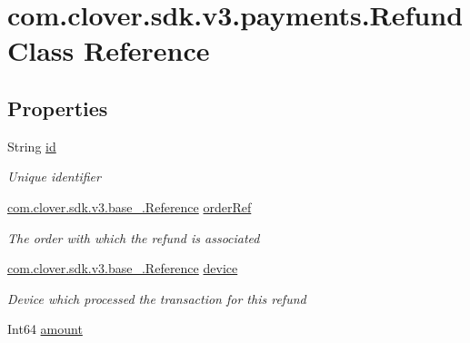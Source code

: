 \hypertarget{classcom_1_1clover_1_1sdk_1_1v3_1_1payments_1_1_refund}{}\section{com.\+clover.\+sdk.\+v3.\+payments.\+Refund Class Reference}
\label{classcom_1_1clover_1_1sdk_1_1v3_1_1payments_1_1_refund}
\subsection*{Properties}
\begin{DoxyCompactItemize}
\item 
String \hyperlink{classcom_1_1clover_1_1sdk_1_1v3_1_1payments_1_1_refund_a17a7c08bf739bab1b4080d0750156c4b}{id}
\begin{DoxyCompactList}\small\item\em Unique identifier \end{DoxyCompactList}\item 
\hyperlink{classcom_1_1clover_1_1sdk_1_1v3_1_1base___1_1_reference}{com.\+clover.\+sdk.\+v3.\+base\+\_\+.\+Reference} \hyperlink{classcom_1_1clover_1_1sdk_1_1v3_1_1payments_1_1_refund_a02bb9634a0b1264d827628cb03ef3731}{order\+Ref}
\begin{DoxyCompactList}\small\item\em The order with which the refund is associated \end{DoxyCompactList}\item 
\hyperlink{classcom_1_1clover_1_1sdk_1_1v3_1_1base___1_1_reference}{com.\+clover.\+sdk.\+v3.\+base\+\_\+.\+Reference} \hyperlink{classcom_1_1clover_1_1sdk_1_1v3_1_1payments_1_1_refund_a7352818ebf5686c54a44d083f2599c71}{device}
\begin{DoxyCompactList}\small\item\em Device which processed the transaction for this refund \end{DoxyCompactList}\item 
Int64 \hyperlink{classcom_1_1clover_1_1sdk_1_1v3_1_1payments_1_1_refund_a34dd643d3722aee8578a5a85044bef18}{amount}

\end{DoxyCompactItemize}
